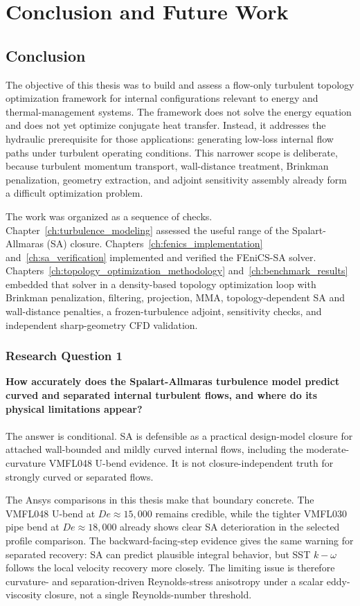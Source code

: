 \chapter{Conclusion and Future Work}
\label{ch:conclusion}

\section{Conclusion}
The objective of this thesis was to build and assess a flow-only turbulent topology optimization framework for internal configurations relevant to energy and thermal-management systems. The framework does not solve the energy equation and does not yet optimize conjugate heat transfer. Instead, it addresses the hydraulic prerequisite for those applications: generating low-loss internal flow paths under turbulent operating conditions. This narrower scope is deliberate, because turbulent momentum transport, wall-distance treatment, Brinkman penalization, geometry extraction, and adjoint sensitivity assembly already form a difficult optimization problem.

The work was organized as a sequence of checks. Chapter~\ref{ch:turbulence_modeling} assessed the useful range of the Spalart-Allmaras (SA) closure. Chapters~\ref{ch:fenics_implementation} and~\ref{ch:sa_verification} implemented and verified the FEniCS-SA solver. Chapters~\ref{ch:topology_optimization_methodology} and~\ref{ch:benchmark_results} embedded that solver in a density-based topology optimization loop with Brinkman penalization, filtering, projection, MMA, topology-dependent SA and wall-distance penalties, a frozen-turbulence adjoint, sensitivity checks, and independent sharp-geometry CFD validation.

\subsection*{Research Question 1}
\textbf{How accurately does the Spalart-Allmaras turbulence model predict curved and separated internal turbulent flows, and where do its physical limitations appear?}
\\ \\
The answer is conditional. SA is defensible as a practical design-model closure for attached wall-bounded and mildly curved internal flows, including the moderate-curvature VMFL048 U-bend evidence. It is not closure-independent truth for strongly curved or separated flows.

The Ansys comparisons in this thesis make that boundary concrete. The VMFL048 U-bend at $De\approx15{,}000$ remains credible, while the tighter VMFL030 pipe bend at $De\approx18{,}000$ already shows clear SA deterioration in the selected profile comparison. The backward-facing-step evidence gives the same warning for separated recovery: SA can predict plausible integral behavior, but SST $k-\omega$ follows the local velocity recovery more closely. The limiting issue is therefore curvature- and separation-driven Reynolds-stress anisotropy under a scalar eddy-viscosity closure, not a single Reynolds-number threshold.

